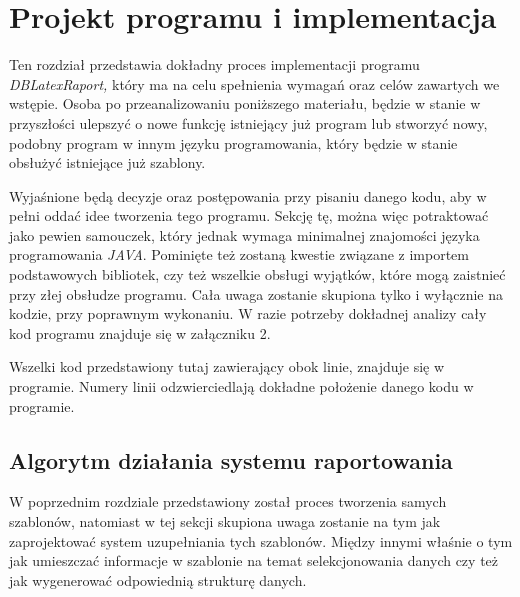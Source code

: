 \chapter{Projekt programu i implementacja}

Ten rozdział przedstawia dokładny proces implementacji programu \emph{DBLatexRaport,}  który ma na celu spełnienia wymagań oraz celów zawartych we wstępie.  Osoba po przeanalizowaniu poniższego materiału, będzie w stanie w przyszłości ulepszyć o nowe funkcję istniejący już program lub stworzyć nowy, podobny program w innym języku programowania, który będzie w stanie obsłużyć istniejące już szablony. 
\par
 Wyjaśnione będą decyzje oraz postępowania przy pisaniu danego kodu, aby w pełni oddać idee tworzenia tego programu. Sekcję tę, można więc potraktować jako pewien samouczek, który jednak wymaga minimalnej znajomości języka programowania \emph{JAVA}. Pominięte też zostaną kwestie związane z importem podstawowych bibliotek, czy też wszelkie obsługi wyjątków, które mogą zaistnieć przy złej obsłudze programu. Cała uwaga zostanie skupiona tylko i wyłącznie na kodzie, przy poprawnym wykonaniu. W razie potrzeby dokładnej analizy cały kod programu znajduje się w załączniku 2.
 \par
 Wszelki kod przedstawiony tutaj zawierający obok linie, znajduje się w programie. Numery linii odzwierciedlają dokładne położenie danego kodu w programie.

\section{Algorytm działania systemu raportowania}

W poprzednim rozdziale przedstawiony został proces tworzenia samych szablonów, natomiast w tej sekcji skupiona uwaga zostanie na tym jak zaprojektować system uzupełniania tych szablonów. Między innymi właśnie o tym jak umieszczać informacje w szablonie na temat selekcjonowania danych czy też jak wygenerować odpowiednią strukturę danych.

